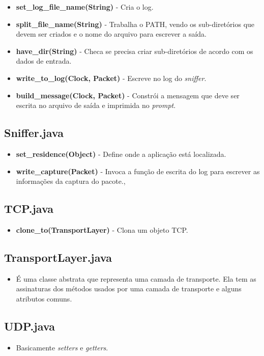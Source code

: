 \documentclass[11pt]{article}
\begin{document}
\begin{itemize}
	\item \textbf{set\_log\_file\_name(String)} - Cria o log.
	\item \textbf{split\_file\_name(String)} - Trabalha o PATH, vendo os sub-diretórios que devem ser criados e o nome do arquivo para escrever a saída.
	\item \textbf{have\_dir(String)} - Checa se precisa criar sub-diretórios de acordo com os dados de entrada.
	\item \textbf{write\_to\_log(Clock, Packet)} - Escreve no log do \textit{sniffer}.
	\item \textbf{build\_message(Clock, Packet)} - Constrói a mensagem que deve ser escrita no arquivo de saída e imprimida no \textit{prompt}.
\end{itemize}

\subsection{Sniffer.java}

\begin{itemize}
	\item \textbf{set\_residence(Object)} - Define onde a aplicação está localizada.
	\item \textbf{write\_capture(Packet)} - Invoca a função de escrita do log para escrever as informações da captura do pacote.,
\end{itemize}

\subsection{TCP.java}

\begin{itemize}
	\item \textbf{clone\_to(TransportLayer)} - Clona um objeto TCP.
\end{itemize}

\subsection{TransportLayer.java}

\begin{itemize}
	\item É uma classe abstrata que representa uma camada de transporte. Ela tem as assinaturas dos métodos usados por uma camada de transporte e alguns atributos comuns.
\end{itemize}

\subsection{UDP.java}

\begin{itemize}
	\item Basicamente \textit{setters} e \textit{getters}.
\end{itemize}
\end{document}
